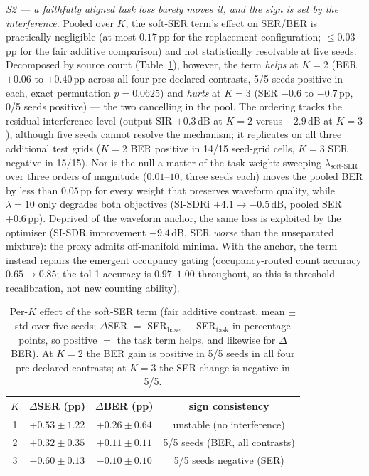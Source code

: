 \documentclass[journal]{IEEEtran}
\begin{document}
\emph{S2 --- a faithfully aligned task loss barely moves it, and the
sign is set by the interference.} Pooled over $K$, the soft-SER term's
effect on SER/BER is practically negligible (at most $0.17$\,pp for the
replacement configuration; $\leq 0.03$\,pp for the fair additive
comparison) and not statistically resolvable at five seeds.
Decomposed by source count (Table~\ref{tab:perk}), however, the term
\emph{helps} at $K{=}2$
(BER $+0.06$ to $+0.40$\,pp across all four pre-declared contrasts,
5/5 seeds positive in each, exact permutation $p = 0.0625$) and
\emph{hurts} at $K{=}3$ (SER $-0.6$ to $-0.7$\,pp, 0/5 seeds
positive) --- the two cancelling in the pool. The ordering tracks the
residual interference level (output SIR $+0.3$\,dB at $K{=}2$ versus
$-2.9$\,dB at $K{=}3$), although five seeds cannot resolve the
mechanism; it replicates on all three additional test grids ($K{=}2$
BER positive in 14/15 seed-grid cells, $K{=}3$ SER negative in 15/15).
Nor is the null a matter of the task weight: sweeping
$\lambda_{\mathrm{soft\text{-}SER}}$ over three orders of magnitude
($0.01$--$10$, three seeds each) moves the pooled BER by less than
$0.05$\,pp for every weight that preserves waveform quality, while
$\lambda{=}10$ only degrades both objectives (SI-SDRi $+4.1 \to -0.5$\,dB,
pooled SER $+0.6$\,pp). Deprived of the waveform anchor, the same loss
is exploited by the optimiser (SI-SDR improvement $-9.4$\,dB, SER
\emph{worse} than the unseparated mixture): the proxy admits
off-manifold minima. With the anchor, the term instead repairs the
emergent occupancy gating
(occupancy-routed count accuracy $0.65 \to 0.85$; the tol-1 accuracy is
$0.97$--$1.00$ throughout, so this is threshold recalibration, not new
counting ability).

\begin{table}[!t]
\centering
\caption{Per-$K$ effect of the soft-SER term (fair additive contrast,
mean $\pm$ std over five seeds; $\Delta$SER $=$ SER$_{\mathrm{base}} -$
SER$_{\mathrm{task}}$ in percentage points, so positive $=$ the task
term helps, and likewise for $\Delta$BER). At $K{=}2$ the BER gain is
positive in 5/5 seeds in all four pre-declared contrasts; at $K{=}3$
the SER change is negative in 5/5.}
\label{tab:perk}
\footnotesize
\begin{tabular}{cccc}
\toprule
$K$ & $\Delta$SER (pp) & $\Delta$BER (pp) & sign consistency \\
\midrule
1 & $+0.53 \pm 1.22$ & $+0.26 \pm 0.64$ & unstable (no interference) \\
2 & $+0.32 \pm 0.35$ & $+0.11 \pm 0.11$ & 5/5 seeds (BER, all contrasts) \\
3 & $-0.60 \pm 0.13$ & $-0.10 \pm 0.10$ & 5/5 seeds negative (SER) \\
\bottomrule
\end{tabular}
\end{table}
\end{document}

